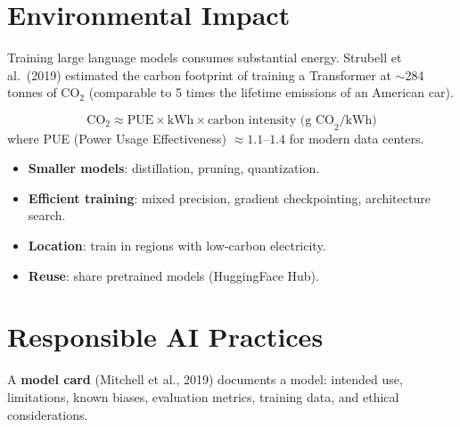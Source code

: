 \section{Environmental Impact}
\label{sec:ethics:environment}

\begin{definition}
Training large language models consumes substantial energy. Strubell
et al.\ (2019) estimated the carbon footprint of training a Transformer
at $\sim$284 tonnes of CO$_2$ (comparable to 5 times the lifetime
emissions of an American car).
\end{definition}

\begin{keyformulas}[title=\textbf{Carbon Footprint Estimation}]
\[
    \text{CO}_2 \approx \text{PUE} \times \text{kWh} \times
    \text{carbon intensity (g CO}_2\text{/kWh)}
\]
where PUE (Power Usage Effectiveness) $\approx 1.1$--$1.4$ for modern
data centers.
\end{keyformulas}

\begin{proposition}
\begin{itemize}
    \item \textbf{Smaller models}: distillation, pruning, quantization.
    \item \textbf{Efficient training}: mixed precision, gradient
    checkpointing, architecture search.
    \item \textbf{Location}: train in regions with low-carbon electricity.
    \item \textbf{Reuse}: share pretrained models (HuggingFace Hub).
\end{itemize}
\end{proposition}

\section{Responsible AI Practices}
\label{sec:ethics:practices}

\begin{definition}
A \textbf{model card} (Mitchell et al., 2019) documents a model:
intended use, limitations, known biases, evaluation metrics, training
data, and ethical considerations.
\end{definition}

